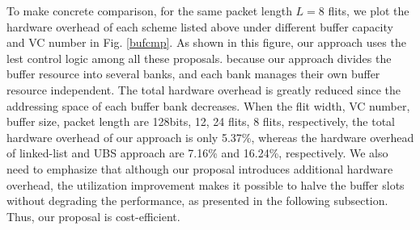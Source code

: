 \documentclass[10pt,conference]{IEEEtran}
\begin{document}
To make concrete comparison, for the same packet length $L=8$ flits, we plot the hardware overhead of each scheme listed above under different buffer capacity and VC number in Fig. \ref{bufcmp}. As shown in this figure, our approach uses the lest control logic among all these proposals. because our approach divides the buffer resource into several banks, and each bank manages their own buffer resource independent. The total hardware overhead is greatly reduced since the addressing space of each buffer bank decreases. When the flit width, VC number, buffer size, packet length are 128bits, 12, 24 flits, 8 flits, respectively, the total hardware overhead of our approach is only 5.37\%, whereas the hardware overhead of linked-list and UBS approach are 7.16\% and 16.24\%, respectively. We also need to emphasize that although our proposal introduces additional hardware overhead, the utilization improvement makes it possible to halve the buffer slots without degrading the performance, as presented in the following subsection. Thus, our proposal is cost-efficient.

\end{document}
